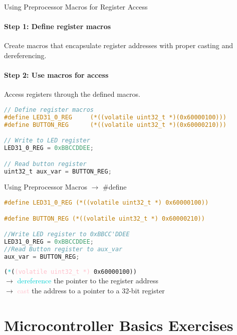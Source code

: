 \begin{KR}{Using Preprocessor Macros for Register Access}
\paragraph{Step 1: Define register macros}
Create macros that encapsulate register addresses with proper casting and dereferencing.
\paragraph{Step 2: Use macros for access}
Access registers through the defined macros.

\begin{lstlisting}[language=C, style=basesmol]
// Define register macros
#define LED31_0_REG     (*((volatile uint32_t *)(0x60000100)))
#define BUTTON_REG      (*((volatile uint32_t *)(0x60000210)))

// Write to LED register
LED31_0_REG = 0xBBCCDDEE;

// Read button register
uint32_t aux_var = BUTTON_REG;
\end{lstlisting}
\end{KR}

\begin{examplecode}{Using Preprocessor Macros} $\rightarrow$ \#define
\begin{lstlisting}[language=C, style=basesmol]
#define LED31_0_REG (*((volatile uint32_t *) 0x60000100))

#define BUTTON_REG (*((volatile uint32_t *) 0x60000210))

//Write LED register to 0xBBCC'DDEE
LED31_0_REG = 0xBBCCDDEE;
//Read Button register to aux_var
aux_var = BUTTON_REG;
\end{lstlisting}
    \vspace{2mm}
    \texttt{(\textcolor{darkturquoise}{*}(\textcolor{pink}{(volatile\ uint32\_t *)} 0x60000100))}\\
    $\rightarrow$ \textcolor{darkturquoise}{dereference} the pointer to the register address\\
    $\rightarrow$ \textcolor{pink}{cast} the address to a pointer to a 32-bit register
\end{examplecode}

\raggedcolumns
\pagebreak

\section{Microcontroller Basics Exercises}


